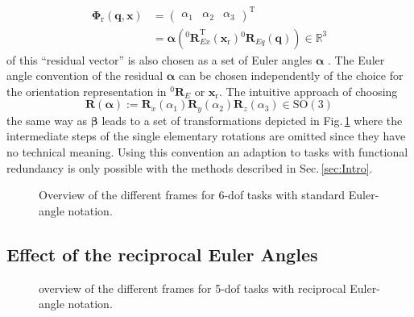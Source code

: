 \documentclass[twocolumn,10pt]{IFTOMM}
\newcommand{\bm}[1]{\boldsymbol{#1}}
\newcommand{\vek}[3]{\boldsymbol{#1}^{#2}_{#3}}
\newcommand{\rotmat}[2]{{{ }^{#1}\boldsymbol{R}}_{#2}}
\newcommand{\transp}[0]{{\mathrm{T}}}
\begin{document}
%
\begin{align}
\bm{\Phi}_{\mathrm{r}}(\bm{q},\bm{x}) &= \begin{pmatrix}
\alpha_1  & \alpha_2 & \alpha_3
\end{pmatrix}^\transp  \nonumber \\
&=\bm{\alpha}\left(\rotmat{0}{Ex}^\transp (\bm{x}_{\mathrm{r}})\rotmat{0}{Eq}(\bm{q})\right) \in {\mathbb{R}}^{3}
\label{equ:Phir_def}
\end{align}
%
of this ``residual vector'' is also chosen as a set of Euler angles $\bm{\alpha}$ \cite{GoldenbergBenFen1985}.
The Euler angle convention of the residual $\bm{\alpha}$ can be chosen independently of the choice for the orientation representation in $\rotmat{0}{E}$ or $\bm{x}_{\mathrm{r}}$.
The intuitive approach of choosing
%
\begin{equation}
\bm{R}(\bm{\alpha}) := \bm{R}_x(\alpha_1) \bm{R}_y(\alpha_2) \bm{R}_z(\alpha_3) \in \mathrm{SO(3)}
\end{equation}
%
the same way as $\bm{\beta}$ leads to a set of transformations depicted in Fig.\,\ref{fig:frames_6dof} where the intermediate steps of the single elementary rotations are omitted since they have no technical meaning.
Using this convention an adaption to tasks with functional redundancy is only possible with the methods described in Sec.\,\ref{sec:Intro}.

\begin{figure}[tb!]
    
    \caption{Overview of the different frames for 6-dof tasks with standard Euler-angle notation.}
    \label{fig:frames_6dof}
\end{figure} 

\subsection{Effect of the reciprocal Euler Angles}
\label{sec:RecEulAng_effect}



\begin{figure}[tb!]
    
    \caption{overview of the different frames for 5-dof tasks with reciprocal Euler-angle notation.}
    \label{fig:frames_5dof}
\end{figure} 


\end{document}
